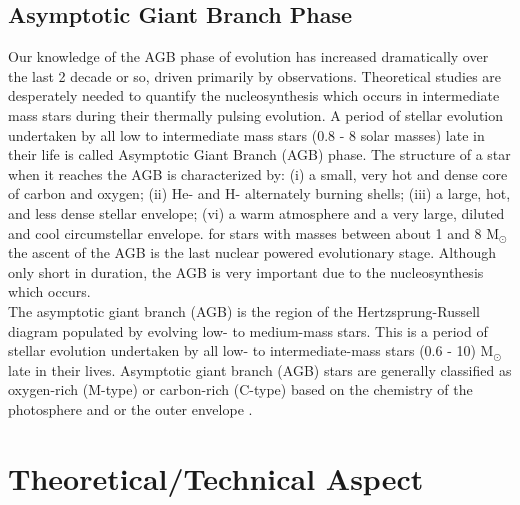 \documentclass[fleqn,a4paper,12pt,oneside]{article}
\begin{document}
\subsection{Asymptotic Giant Branch Phase}
Our knowledge of the AGB phase of evolution has increased
dramatically over the last  2 decade or so, driven primarily by
observations. Theoretical studies are desperately needed to
quantify the nucleosynthesis which occurs in intermediate mass
stars during their thermally pulsing evolution. A period of
stellar evolution undertaken by all low to intermediate mass stars
(0.8 - 8 solar masses) late in their life is called Asymptotic
Giant Branch (AGB) phase. The structure of a star when it reaches
the AGB is characterized by: (i) a small, very hot and dense core
of carbon and oxygen; (ii) He- and H- alternately burning shells;
(iii) a large, hot, and less dense stellar envelope; (vi) a warm
atmosphere and a very large, diluted and cool circumstellar
envelope. for stars with masses between about 1 and 8 M$_{\odot}$
the ascent of the AGB is the last nuclear powered evolutionary
stage. Although only short in duration, the AGB is very important
due to the nucleosynthesis which occurs.
\\
  The
asymptotic giant branch (AGB) is the region of the
Hertzsprung-Russell diagram populated by evolving low- to
medium-mass stars. This is a period of stellar evolution
undertaken by all low- to intermediate-mass stars (0.6 - 10)
M$_{\odot}$ late in their lives. Asymptotic giant branch (AGB)
stars are generally classified as oxygen-rich (M-type) or
carbon-rich (C-type) based on the chemistry of the photosphere and
or the outer envelope \cite{1}.



\section{ Theoretical/Technical Aspect}
\end{document}
